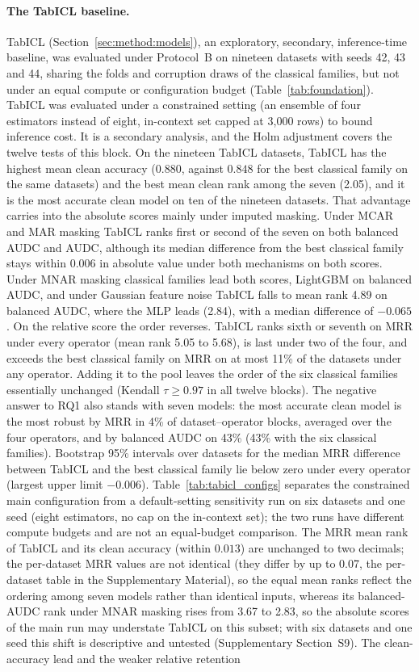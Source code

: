 \documentclass[pdflatex,sn-mathphys]{sn-jnl}
\theoremstyle{thmstyleone}
\theoremstyle{thmstyletwo}
\theoremstyle{thmstylethree}
\begin{document}
\paragraph{The TabICL baseline.} TabICL (Section~\ref{sec:method:models}), an exploratory, secondary, inference-time baseline, was evaluated under Protocol~B on nineteen datasets with seeds 42, 43 and 44, sharing the folds and corruption draws of the classical families, but not under an equal compute or configuration budget (Table~\ref{tab:foundation}). TabICL was evaluated under a constrained setting (an ensemble of four estimators instead of eight, in-context set capped at 3{,}000 rows) to bound inference cost. It is a secondary analysis, and the Holm adjustment covers the twelve tests of this block. On the nineteen TabICL datasets, TabICL has the highest mean clean accuracy ($0.880$, against $0.848$ for the best classical family on the same datasets) and the best mean clean rank among the seven (2.05), and it is the most accurate clean model on ten of the nineteen datasets. That advantage carries into the absolute scores mainly under imputed masking. Under MCAR and MAR masking TabICL ranks first or second of the seven on both balanced AUDC and AUDC, although its median difference from the best classical family stays within $0.006$ in absolute value under both mechanisms on both scores. Under MNAR masking classical families lead both scores, LightGBM on balanced AUDC, and under Gaussian feature noise TabICL falls to mean rank 4.89 on balanced AUDC, where the MLP leads (2.84), with a median difference of $-0.065$. On the relative score the order reverses. TabICL ranks sixth or seventh on MRR under every operator (mean rank 5.05 to 5.68), is last under two of the four, and exceeds the best classical family on MRR on at most 11\% of the datasets under any operator. Adding it to the pool leaves the order of the six classical families essentially unchanged (Kendall $\tau\ge0.97$ in all twelve blocks). The negative answer to RQ1 also stands with seven models: the most accurate clean model is the most robust by MRR in 4\% of dataset--operator blocks, averaged over the four operators, and by balanced AUDC on 43\% (43\% with the six classical families). Bootstrap 95\% intervals over datasets for the median MRR difference between TabICL and the best classical family lie below zero under every operator (largest upper limit $-0.006$). Table~\ref{tab:tabicl_configs} separates the constrained main configuration from a default-setting sensitivity run on six datasets and one seed (eight estimators, no cap on the in-context set); the two runs have different compute budgets and are not an equal-budget comparison. The MRR mean rank of TabICL and its clean accuracy (within $0.013$) are unchanged to two decimals; the per-dataset MRR values are not identical (they differ by up to 0.07, the per-dataset table in the Supplementary Material), so the equal mean ranks reflect the ordering among seven models rather than identical inputs, whereas its balanced-AUDC rank under MNAR masking rises from 3.67 to 2.83, so the absolute scores of the main run may understate TabICL on this subset; with six datasets and one seed this shift is descriptive and untested (Supplementary Section~S9). The clean-accuracy lead and the weaker relative retention 
\end{document}
